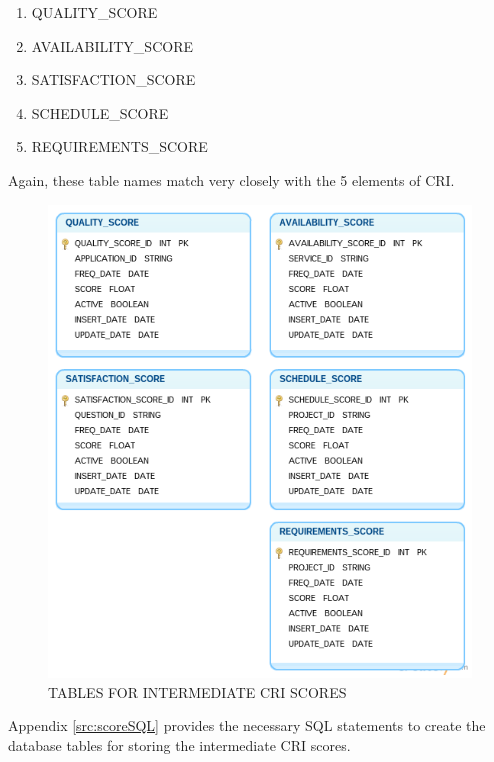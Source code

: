 \documentclass[SDSUThesis.tex]{subfiles}
\begin{document}
            \begin{enumerate}
                \item QUALITY\_SCORE
                \item AVAILABILITY\_SCORE
                \item SATISFACTION\_SCORE
                \item SCHEDULE\_SCORE
                \item REQUIREMENTS\_SCORE
            \end{enumerate}
            Again, these table names match very closely with the 5 elements of CRI.
        
           \begin{figure}[ht]
                \centering
                \includegraphics[scale=.55]{images/score_tables.png}
                \caption{TABLES FOR INTERMEDIATE CRI SCORES}
                \label{fig:score_tables}
            \end{figure}%
            
            Appendix \ref{src:scoreSQL} provides the necessary SQL statements to create the 
            database tables for storing the intermediate CRI scores.
        
\end{document}
